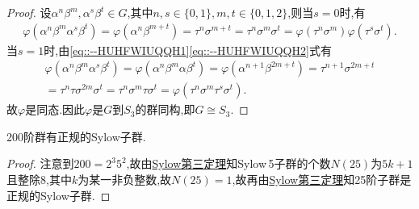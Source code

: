 \documentclass[../../main.tex]{subfiles}%
\begin{document}
\begin{proof}
设$\alpha^n\beta^m,\alpha^s\beta^t\in G$,其中$n,s\in \{ 0,1 \} ,m,t\in \{ 0,1,2 \} $,则当$s=0$时,有
\begin{align*}
\varphi (\alpha^n\beta^m\alpha^s\beta^t)=\varphi (\alpha^n\beta^{m+t})=\tau^n\sigma^{m+t}=\tau^n\sigma^m\sigma^t=\varphi (\tau^n\sigma^m)\varphi (\tau^s\sigma^t).
\end{align*}
当$s=1$时,由\eqref{eq::--HUHFWIUQQH1}\eqref{eq::--HUHFWIUQQH2}式有
\begin{align*}
\varphi (\alpha^n\beta^m\alpha^s\beta^t)=\varphi (\alpha^n\beta^m\alpha \beta^t)=\varphi (\alpha^{n+1}\beta^{2m+t})=\tau^{n+1}\sigma^{2m+t}\\
=\tau^n\tau \sigma^{2m}\sigma^t=\tau^n\sigma^m\tau \sigma^t=\varphi (\tau^n\sigma^m\tau^s\sigma^t).
\end{align*}
故$\varphi$是同态.因此$\varphi$是$G$到$S_3$的群同构,即$G\cong S_3$.
\end{proof}

\begin{example}
200阶群有正规的Sylow子群.
\end{example}
\begin{proof}
注意到$200=2^3 5^2$,故由\hyperref[theorem:Sylow第三定理]{Sylow第三定理}知Sylow$\,$5子群的个数$N(25)$为$5k+1$且整除8,其中$k$为某一非负整数,故$N(25)=1$,故再由\hyperref[theorem:Sylow第三定理]{Sylow第三定理}知25阶子群是正规的Sylow子群.
\end{proof}
\end{document}
